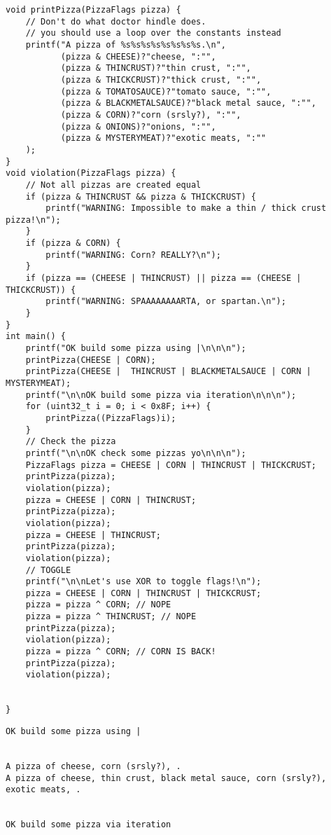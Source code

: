 \documentclass[11pt]{article}
\begin{document}
\begin{enumerate}
\begin{verbatim}
void printPizza(PizzaFlags pizza) {
    // Don't do what doctor hindle does.
    // you should use a loop over the constants instead
    printf("A pizza of %s%s%s%s%s%s%s%s.\n",
           (pizza & CHEESE)?"cheese, ":"",
           (pizza & THINCRUST)?"thin crust, ":"",
           (pizza & THICKCRUST)?"thick crust, ":"",
           (pizza & TOMATOSAUCE)?"tomato sauce, ":"",
           (pizza & BLACKMETALSAUCE)?"black metal sauce, ":"",
           (pizza & CORN)?"corn (srsly?), ":"",
           (pizza & ONIONS)?"onions, ":"",
           (pizza & MYSTERYMEAT)?"exotic meats, ":""
    );
}
void violation(PizzaFlags pizza) {
    // Not all pizzas are created equal
    if (pizza & THINCRUST && pizza & THICKCRUST) {
        printf("WARNING: Impossible to make a thin / thick crust pizza!\n");
    }
    if (pizza & CORN) {
        printf("WARNING: Corn? REALLY?\n");
    }
    if (pizza == (CHEESE | THINCRUST) || pizza == (CHEESE | THICKCRUST)) {
        printf("WARNING: SPAAAAAAAARTA, or spartan.\n");
    }
}
int main() {
    printf("OK build some pizza using |\n\n\n");
    printPizza(CHEESE | CORN);
    printPizza(CHEESE |  THINCRUST | BLACKMETALSAUCE | CORN | MYSTERYMEAT);
    printf("\n\nOK build some pizza via iteration\n\n\n");
    for (uint32_t i = 0; i < 0x8F; i++) {
        printPizza((PizzaFlags)i);
    }
    // Check the pizza
    printf("\n\nOK check some pizzas yo\n\n\n");
    PizzaFlags pizza = CHEESE | CORN | THINCRUST | THICKCRUST;
    printPizza(pizza);
    violation(pizza);
    pizza = CHEESE | CORN | THINCRUST;
    printPizza(pizza);
    violation(pizza);
    pizza = CHEESE | THINCRUST;
    printPizza(pizza);
    violation(pizza);
    // TOGGLE
    printf("\n\nLet's use XOR to toggle flags!\n");
    pizza = CHEESE | CORN | THINCRUST | THICKCRUST;
    pizza = pizza ^ CORN; // NOPE
    pizza = pizza ^ THINCRUST; // NOPE
    printPizza(pizza);
    violation(pizza);
    pizza = pizza ^ CORN; // CORN IS BACK!
    printPizza(pizza);
    violation(pizza);


}

\end{verbatim}

\begin{verbatim}
OK build some pizza using |


A pizza of cheese, corn (srsly?), .
A pizza of cheese, thin crust, black metal sauce, corn (srsly?), exotic meats, .


OK build some pizza via iteration



\end{verbatim}
\end{enumerate}
\end{document}
